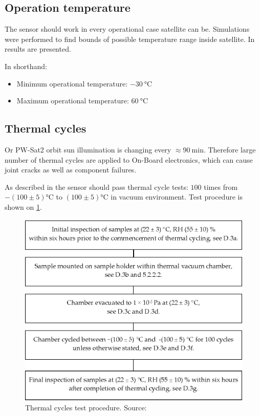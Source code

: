\subsection{Operation temperature}
	The sensor should work in every operational case satellite can be. Simulations were performed to find bounds of possible temperature range inside satellite.	In \cite{PWSAT_TCS_CDR} results are presented. 
	
	In shorthand:
	\begin{itemize}
		\item Minimum operational temperature: $\SI{-30}{\degreeCelsius}$
		\item Maximum operational temperature: $\SI{60}{\degreeCelsius}$
	\end{itemize}


\subsection{Thermal cycles}
	Or PW-Sat2 orbit sun illumination is changing every $\approx \SI{90}{\minute}$. Therefore large number of thermal cycles are applied to On-Board electronics, which can cause joint cracks as well as component failures. 
	
	As described in \cite{ECSS_Q_ST_70_04C} the sensor should pass thermal cycle tests: $100$ times from $- (100 \pm 5)$\si{\degreeCelsius} to $(100 \pm 5)$\si{\degreeCelsius} in vacuum environment. Test procedure is shown on \ref{thermal_tests}.
	
	\begin{figure}[H]
		\centering
		\includegraphics[width=0.5\paperwidth]{img/thermal_cycles.eps}
		\caption{Thermal cycles test procedure. Source: \cite{ECSS_Q_ST_70_04C}}
		\label{thermal_tests}
	\end{figure}
